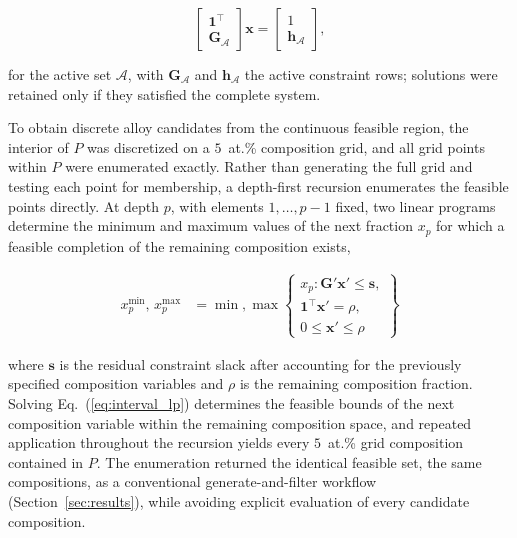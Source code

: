 \medskip
\begin{equation}
\begin{bmatrix} \mathbf{1}^{\top} \\ \mathbf{G}_{\mathcal{A}} \end{bmatrix}
\mathbf{x}
=
\begin{bmatrix} 1 \\ \mathbf{h}_{\mathcal{A}} \end{bmatrix} ,
\label{eq:vertex_system}
\end{equation}
\medskip


for the active set \(\mathcal{A}\), with \(\mathbf{G}_{\mathcal{A}}\) and
\(\mathbf{h}_{\mathcal{A}}\) the active constraint rows; solutions were retained
only if they satisfied the complete system.

To obtain discrete alloy candidates from the continuous feasible region, the
interior of \(P\) was discretized on a \(5\)~at.\% composition grid, and all grid
points within \(P\) were enumerated exactly. Rather than generating the full grid
and testing each point for membership, a depth-first recursion enumerates the
feasible points directly. At depth \(p\), with elements \(1,\dots,p-1\) fixed, two
linear programs determine the minimum and maximum values of the next fraction
\(x_p\) for which a feasible completion of the remaining composition exists,

\medskip
\begin{equation}
\begin{aligned}
x_p^{\min},\,x_p^{\max}
&=
\min,\max
\left\{
\begin{array}{l}
x_p : \mathbf{G}'\mathbf{x}' \le \mathbf{s},\\[4pt]
\mathbf{1}^{\top}\mathbf{x}'=\rho,\\
0 \le \mathbf{x}' \le \rho
\end{array}
\right\}
\end{aligned}
\label{eq:interval_lp}
\end{equation}
\medskip


where \(\mathbf{s}\) is the residual constraint slack after accounting for the
previously specified composition variables and \(\rho\) is the remaining
composition fraction. Solving Eq.~(\ref{eq:interval_lp}) determines the feasible
bounds of the next composition variable within the remaining composition space,
and repeated application throughout the recursion yields every \(5\)~at.\% grid
composition contained in \(P\). The enumeration returned the identical feasible
set, the same compositions, as a conventional generate-and-filter workflow
(Section~\ref{sec:results}), while avoiding explicit evaluation of every
candidate composition.


